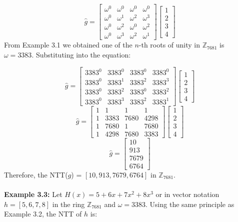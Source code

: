 \documentclass[12pt]{report}
\begin{document}
\[\hat{g}=\begin{bmatrix}\omega^{0}&\omega^{0}&\omega^{0}&\omega^{0}\\ \omega^{0}&\omega^{1}&\omega^{2}&\omega^{3}\\ \omega^{0}&\omega^{2}&\omega^{0}&\omega^{2}\\ \omega^{0}&\omega^{3}&\omega^{2}&\omega^{1}\end{bmatrix}\begin{bmatrix}1\\ 2\\ 3\\ 4\end{bmatrix}\]
From Example 3.1 we obtained one of the $n$-th roots of unity in $\mathbb{Z}_{7681}$ is $\omega=3383.$ Substituting into the equation:

\[\hat{g}=\begin{bmatrix}3383^{0}&3383^{0}&3383^{0}&3383^{0}\\ 3383^{0}&3383^{1}&3383^{2}&3383^{3}\\ 3383^{0}&3383^{2}&3383^{0}&3383^{2}\\ 3383^{0}&3383^{3}&3383^{2}&3383^{1}\end{bmatrix}\begin{bmatrix}1\\ 2\\ 3\\ 4\end{bmatrix}\]
\[\hat{g}=\begin{bmatrix}1&1&1&1\\ 1&3383&7680&4298\\ 1&7680&1&7680\\ 1&4298&7680&3383\end{bmatrix}\begin{bmatrix}1\\ 2\\ 3\\ 4\end{bmatrix}\]
\[\hat{g}=\begin{bmatrix}10\\ 913\\ 7679\\ 6764\end{bmatrix}\]
Therefore, the NTT($g$) = $[10,913,7679,6764]$ in $\mathbb{Z}_{7681}.$ \\ \\
\textbf{Example 3.3:} Let $H(x)=5+6x+7x^{2}+8x^{3}$ or in vector notation $h=[5,6,7,8]$ in the ring $\mathbb{Z}_{7681}$ and $\omega=3383.$ Using the same principle as Example 3.2, the NTT of $h$ is:
\end{document}
